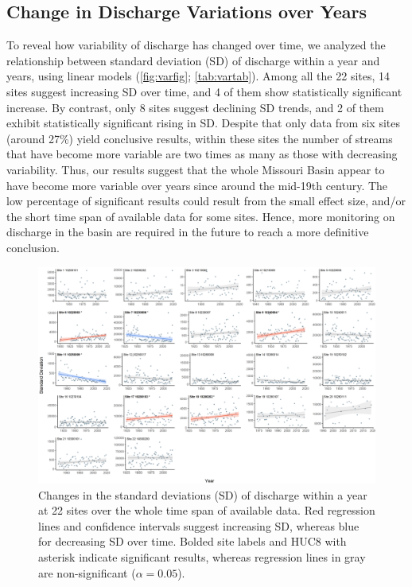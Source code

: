 \documentclass[12pt,]{article}
\makeatletter
\def\maxwidth{\ifdim\Gin@nat@width>\linewidth\linewidth\else\Gin@nat@width\fi}
\makeatother
\begin{document}
\hypertarget{change-in-discharge-variations-over-years}{%
\subsection{Change in Discharge Variations over
Years}\label{change-in-discharge-variations-over-years}}

To reveal how variability of discharge has changed over time, we
analyzed the relationship between standard deviation (SD) of discharge
within a year and years, using linear models (\autoref{fig:varfig};
\autoref{tab:vartab}). Among all the 22 sites, 14 sites suggest
increasing SD over time, and 4 of them show statistically significant
increase. By contrast, only 8 sites suggest declining SD trends, and 2
of them exhibit statistically significant rising in SD. Despite that
only data from six sites (around 27\%) yield conclusive results, within
these sites the number of streams that have become more variable are two
times as many as those with decreasing variability. Thus, our results
suggest that the whole Missouri Basin appear to have become more
variable over years since around the mid-19th century. The low
percentage of significant results could result from the small effect
size, and/or the short time span of available data for some sites.
Hence, more monitoring on discharge in the basin are required in the
future to reach a more definitive conclusion.

\begin{figure}[H]
\includegraphics[width=\maxwidth]{../Figures/sd_year} \caption{\label{fig:varfig} Changes in the standard deviations (SD) of discharge within a year at 22 sites over the whole time span of available data. Red regression lines and confidence intervals suggest increasing SD, whereas blue for decreasing SD over time. Bolded site labels and HUC8 with asterisk indicate significant results, whereas regression lines in gray are non-significant ($\alpha = 0.05$).}\label{fig:varfig}
\end{figure}
\end{document}
